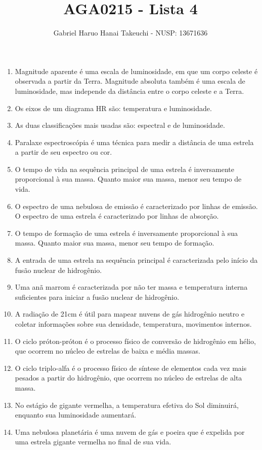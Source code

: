\documentclass{article}
\author{Gabriel Haruo Hanai Takeuchi - NUSP: 13671636}
\title{AGA0215 - Lista 4}
\date{}
\begin{document}
\maketitle

\begin{enumerate}
  \item Magnitude aparente é uma escala de luminosidade, em que um corpo celeste é observada a partir da Terra. Magnitude absoluta também é uma escala de luminosidade, mas independe da distância entre o corpo celeste e a Terra.
  \item Os eixos de um diagrama HR são: temperatura e luminosidade.
  \item As duas classificações mais usadas são: espectral e de luminosidade.
  \item Paralaxe espectroscópia é uma técnica para medir a distância de uma estrela a partir de seu espectro ou cor.
  \item O tempo de vida na sequência principal de uma estrela é inversamente proporcional à sua massa. Quanto maior sua massa, menor seu tempo de vida.
  \item O espectro de uma nebulosa de emissão é caracterizado por linhas de emissão. O espectro de uma estrela é caracterizado por linhas de absorção.
  \item O tempo de formação de uma estrela é inversamente proporcional à sua massa. Quanto maior sua massa, menor seu tempo de formação.
  \item A entrada de uma estrela na sequência principal é caracterizada pelo início da fusão nuclear de hidrogênio.
  \item Uma anã marrom é caracterizada por não ter massa e temperatura interna suficientes para iniciar a fusão nuclear de hidrogênio.
  \item A radiação de 21cm é útil para mapear nuvens de gás hidrogênio neutro e coletar informações sobre sua densidade, temperatura, movimentos internos.
  \item O ciclo próton-próton é o processo físico de conversão de hidrogênio em hélio, que ocorrem no núcleo de estrelas de baixa e média massas.
  \item O ciclo triplo-alfa é o processo físico de síntese de elementos cada vez mais pesados a partir do hidrogênio, que ocorrem no núcleo de estrelas de alta massa.
  \item No estágio de gigante vermelha, a temperatura efetiva do Sol diminuirá, enquanto sua luminosidade aumentará.
  \item Uma nebulosa planetária é uma nuvem de gás e poeira que é expelida por uma estrela gigante vermelha no final de sua vida.

\end{enumerate}
\end{document}
